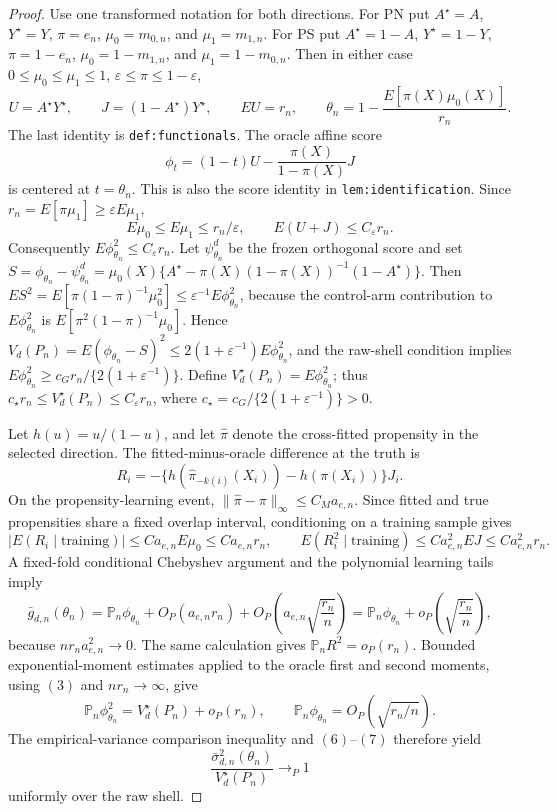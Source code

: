 \documentclass{article}
\begin{document}
\begin{proof}
Use one transformed notation for both directions. For PN put \(A^\star=A\), \(Y^\star=Y\), \(\pi=e_n\), \(\mu_0=m_{0,n}\), and \(\mu_1=m_{1,n}\). For PS put \(A^\star=1-A\), \(Y^\star=1-Y\), \(\pi=1-e_n\), \(\mu_0=1-m_{1,n}\), and \(\mu_1=1-m_{0,n}\). Then in either case \(0\le\mu_0\le\mu_1\le1\), \(\varepsilon\le\pi\le1-\varepsilon\),
\[U=A^\star Y^\star,\qquad J=(1-A^\star)Y^\star,\qquad E U=r_n,\qquad \theta_n=1-\frac{E[\pi(X)\mu_0(X)]}{r_n}.\tag{1}\]
The last identity is \texttt{def:functionals}. The oracle affine score
\[\phi_t=(1-t)U-\frac{\pi(X)}{1-\pi(X)}J\tag{2}\]
is centered at \(t=\theta_n\). This is also the score identity in \texttt{lem:identification}. Since \(r_n=E[\pi\mu_1]\ge\varepsilon E\mu_1\),
\[E\mu_0\le E\mu_1\le r_n/\varepsilon,\qquad E(U+J)\le C_\varepsilon r_n.\tag{3}\]
Consequently \(E\phi_{\theta_n}^2\le C_\varepsilon r_n\). Let \(\psi_{\theta_n}^d\) be the frozen orthogonal score and set \(S=\phi_{\theta_n}-\psi_{\theta_n}^d=\mu_0(X)\{A^\star-\pi(X)(1-\pi(X))^{-1}(1-A^\star)\}\). Then \(ES^2=E[\pi(1-\pi)^{-1}\mu_0^2]\le\varepsilon^{-1}E\phi_{\theta_n}^2\), because the control-arm contribution to \(E\phi_{\theta_n}^2\) is \(E[\pi^2(1-\pi)^{-1}\mu_0]\). Hence \(V_d(P_n)=E(\phi_{\theta_n}-S)^2\le2(1+\varepsilon^{-1})E\phi_{\theta_n}^2\), and the raw-shell condition implies \(E\phi_{\theta_n}^2\ge c_Gr_n/\{2(1+\varepsilon^{-1})\}\). Define \(V_d^\star(P_n)=E\phi_{\theta_n}^2\); thus \(c_\star r_n\le V_d^\star(P_n)\le C_\varepsilon r_n\), where \(c_\star=c_G/\{2(1+\varepsilon^{-1})\}>0\).

Let \(h(u)=u/(1-u)\), and let \(\widehat\pi\) denote the cross-fitted propensity in the selected direction. The fitted-minus-oracle difference at the truth is
\[R_i=-\{h(\widehat\pi_{-k(i)}(X_i))-h(\pi(X_i))\}J_i.\tag{4}\]
On the propensity-learning event, \(\lVert\widehat\pi-\pi\rVert_\infty\le C_Ma_{e,n}\). Since fitted and true propensities share a fixed overlap interval, conditioning on a training sample gives
\[|E(R_i\mid\text{training})|\le C a_{e,n}E\mu_0\le Ca_{e,n}r_n,\qquad E(R_i^2\mid\text{training})\le Ca_{e,n}^2EJ\le Ca_{e,n}^2r_n.\tag{5}\]
A fixed-fold conditional Chebyshev argument and the polynomial learning tails imply
\[\bar g_{d,n}(\theta_n)=\mathbb P_n\phi_{\theta_n}+O_P(a_{e,n}r_n)+O_P\!\left(a_{e,n}\sqrt{\frac{r_n}{n}}\right)=\mathbb P_n\phi_{\theta_n}+o_P\!\left(\sqrt{\frac{r_n}{n}}\right),\tag{6}\]
because \(nr_na_{e,n}^2\to0\). The same calculation gives \(\mathbb P_nR^2=o_P(r_n)\). Bounded exponential-moment estimates applied to the oracle first and second moments, using \((3)\) and \(nr_n\to\infty\), give
\[\mathbb P_n\phi_{\theta_n}^2=V_d^\star(P_n)+o_P(r_n),\qquad \mathbb P_n\phi_{\theta_n}=O_P(\sqrt{r_n/n}).\tag{7}\]
The empirical-variance comparison inequality and \((6)\)--\((7)\) therefore yield
\[\frac{\bar\sigma_{d,n}^2(\theta_n)}{V_d^\star(P_n)}\longrightarrow_P1\tag{8}\]
uniformly over the raw shell.


\end{proof}
\end{document}
